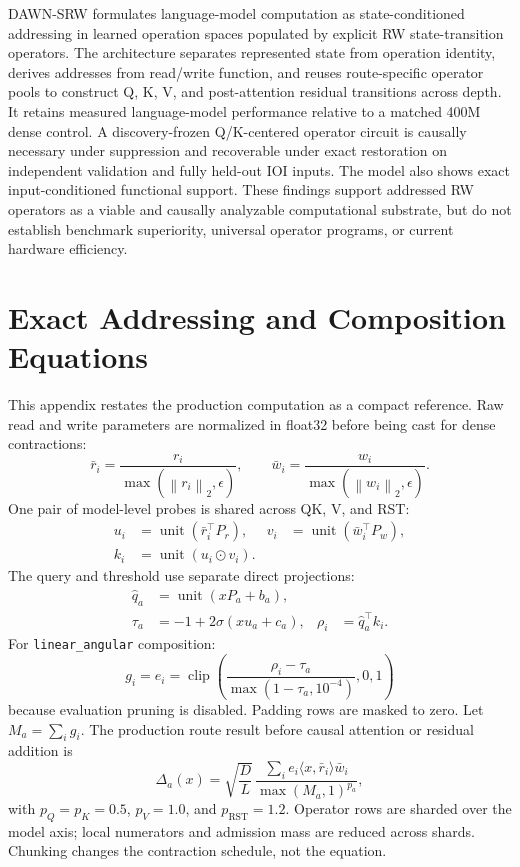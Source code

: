 \documentclass{article}
\newcommand{\norm}[1]{\left\lVert #1 \right\rVert}
\newcommand{\od}{\mathbin{\odot}}
\newcommand{\DAWN}{DAWN-SRW}
\begin{document}
\DAWN{} formulates language-model computation as state-conditioned addressing
in learned operation spaces populated by explicit RW state-transition
operators. The architecture separates represented state from operation
identity, derives addresses from read/write function, and reuses route-specific
operator pools to construct Q, K, V, and post-attention residual transitions
across depth. It retains measured language-model performance relative to a
matched 400M dense control. A discovery-frozen Q/K-centered operator circuit is
causally necessary under suppression and recoverable under exact restoration
on independent validation and fully held-out IOI inputs. The model also shows
exact input-conditioned functional support. These findings support addressed
RW operators as a viable and causally analyzable computational substrate, but
do not establish benchmark superiority, universal operator programs, or
current hardware efficiency.

\appendix

\section{Exact Addressing and Composition Equations}
\label{app:equations}

This appendix restates the production computation as a compact reference. Raw
read and write parameters are normalized in float32 before being cast for
dense contractions:
\[
\bar r_i=\frac{r_i}{\max(\norm{r_i}_2,\epsilon)},\qquad
\bar w_i=\frac{w_i}{\max(\norm{w_i}_2,\epsilon)}.
\]
One pair of model-level probes is shared across QK, V, and RST:
\[
\begin{aligned}
u_i&=\operatorname{unit}(\bar r_i^\top P_r),&
v_i&=\operatorname{unit}(\bar w_i^\top P_w),\\
k_i&=\operatorname{unit}(u_i\od v_i).&&
\end{aligned}
\]
The query and threshold use separate direct projections:
\[
\begin{aligned}
\hat q_a&=\operatorname{unit}(xP_a+b_a),\\
\tau_a&=-1+2\sigma(xu_a+c_a),&
\rho_i&=\hat q_a^\top k_i.
\end{aligned}
\]
For \texttt{linear\_angular} composition:
\[
g_i=e_i=
\operatorname{clip}\!\left(
\frac{\rho_i-\tau_a}{\max(1-\tau_a,10^{-4})},0,1\right)
\]
because evaluation pruning is disabled. Padding rows are masked to zero.
Let \(M_a=\sum_i g_i\). The production route result before causal attention or
residual addition is
\[
\Delta_a(x)=
\sqrt{\frac{D}{L}}\,
\frac{\sum_i e_i\langle x,\bar r_i\rangle\bar w_i}
{\max(M_a,1)^{p_a}},
\]
with \(p_Q=p_K=0.5\), \(p_V=1.0\), and \(p_{\mathrm{RST}}=1.2\).
Operator rows are sharded over the model axis; local numerators and admission
mass are reduced across shards. Chunking changes the contraction schedule, not
the equation.
\end{document}
